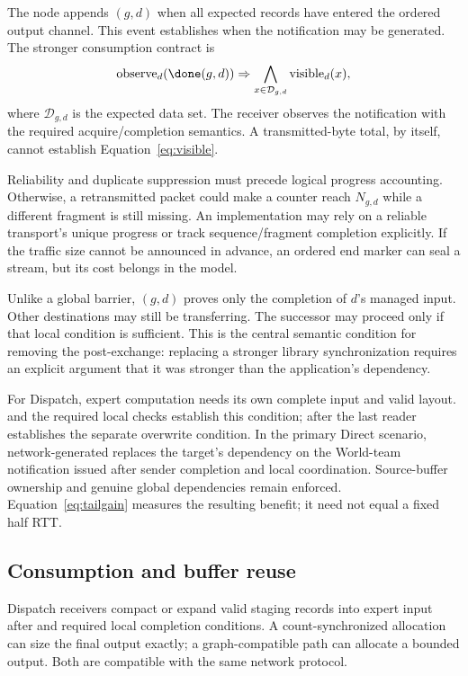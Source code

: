 The node appends \done$(g,d)$ when all expected records have entered the ordered output channel. This event establishes when the notification may be generated. The stronger consumption contract is
\begin{equation}
 \operatorname{observe}_d(\done(g,d))
 \Rightarrow \bigwedge_{x\in\mathcal{D}_{g,d}}\operatorname{visible}_d(x),
 \label{eq:visible}
\end{equation}
where $\mathcal{D}_{g,d}$ is the expected data set. The receiver observes the notification with the required acquire/completion semantics. A transmitted-byte total, by itself, cannot establish Equation~\eqref{eq:visible}.

Reliability and duplicate suppression must precede logical progress accounting. Otherwise, a retransmitted packet could make a counter reach $N_{g,d}$ while a different fragment is still missing. An implementation may rely on a reliable transport's unique progress or track sequence/fragment completion explicitly. If the traffic size cannot be announced in advance, an ordered end marker can seal a stream, but its cost belongs in the model.

Unlike a global barrier, \done$(g,d)$ proves only the completion of $d$'s managed input. Other destinations may still be transferring. The successor may proceed only if that local condition is sufficient. This is the central semantic condition for removing the post-exchange: replacing a stronger library synchronization requires an explicit argument that it was stronger than the application's dependency.

For Dispatch, expert computation needs its own complete input and valid layout. \done{} and the required local checks establish this condition; \recycle{} after the last reader establishes the separate overwrite condition. In the primary Direct scenario, network-generated \done{} replaces the target's dependency on the World-team notification issued after sender completion and local coordination. Source-buffer ownership and genuine global dependencies remain enforced. Equation~\eqref{eq:tailgain} measures the resulting benefit; it need not equal a fixed half RTT.

\subsection{Consumption and buffer reuse}
Dispatch receivers compact or expand valid staging records into expert input after \done{} and required local completion conditions. A count-synchronized allocation can size the final output exactly; a graph-compatible path can allocate a bounded output. Both are compatible with the same network protocol.

